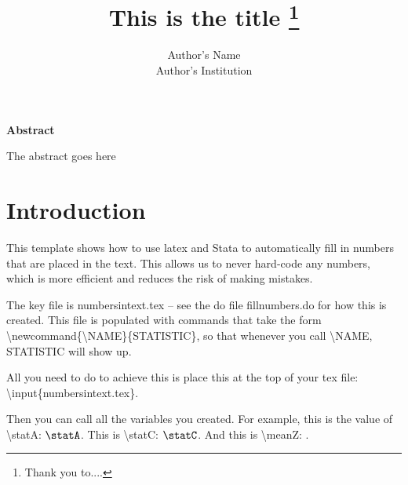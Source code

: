 \documentclass[12pt]{article}
\begin{document}


\begin{titlepage} 

\title{\Large This is the title
\thanks{Thank you to....}\vspace{1cm}}

\author{Author's Name \\ Author's Institution \vspace{1cm}}
\date{}
\maketitle
\thispagestyle{empty}
\bigskip

\centerline{\bf Abstract}\vspace{0.5cm}

\noindent The abstract goes here

\end{titlepage}

\doublespace
\onehalfspacing

\section{Introduction}

This template shows how to use latex and Stata to automatically fill in numbers that are placed in the text. This allows us to never hard-code any numbers, which is more efficient and reduces the risk of making mistakes.

The key file is \textsf{numbersintext.tex} -- see the do file \textsf{fillnumbers.do} for how this is created. This file is populated with commands that take the form \textsf{\textbackslash newcommand\{\textbackslash NAME\}\{STATISTIC\}}, so that whenever you call \textbackslash NAME, STATISTIC will show up.

All you need to do to achieve this is place this at the top of your tex file: \textsf{\textbackslash input\{numbersintext.tex\}}.

Then you can call all the variables you created. For example, this is the value of \textsf{\textbackslash statA}: $\statA$. This is \textsf{\textbackslash statC}: $\statC$. And this is \textsf{\textbackslash meanZ}: \meanZ.
\end{document}
